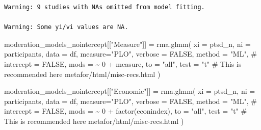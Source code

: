 \documentclass[
  letterpaper,
  DIV=11,
  numbers=noendperiod]{scrartcl}
\newenvironment{Shaded}{\begin{snugshade}}{\end{snugshade}}
\newcommand{\AttributeTok}[1]{\textcolor[rgb]{0.40,0.45,0.13}{#1}}
\newcommand{\CommentTok}[1]{\textcolor[rgb]{0.37,0.37,0.37}{#1}}
\newcommand{\ConstantTok}[1]{\textcolor[rgb]{0.56,0.35,0.01}{#1}}
\newcommand{\DecValTok}[1]{\textcolor[rgb]{0.68,0.00,0.00}{#1}}
\newcommand{\FunctionTok}[1]{\textcolor[rgb]{0.28,0.35,0.67}{#1}}
\newcommand{\NormalTok}[1]{\textcolor[rgb]{0.00,0.23,0.31}{#1}}
\newcommand{\OtherTok}[1]{\textcolor[rgb]{0.00,0.23,0.31}{#1}}
\newcommand{\SpecialCharTok}[1]{\textcolor[rgb]{0.37,0.37,0.37}{#1}}
\newcommand{\StringTok}[1]{\textcolor[rgb]{0.13,0.47,0.30}{#1}}
\begin{document}
\begin{verbatim}
Warning: 9 studies with NAs omitted from model fitting.

Warning: Some yi/vi values are NA.
\end{verbatim}

\begin{Shaded}
\begin{Highlighting}[]
\NormalTok{moderation\_models\_nointercept[[}\StringTok{"Measure"}\NormalTok{]] }\OtherTok{=} \FunctionTok{rma.glmm}\NormalTok{(}
  \AttributeTok{xi =} \StringTok{\textasciigrave{}}\AttributeTok{ptsd\_n}\StringTok{\textasciigrave{}}\NormalTok{, }
  \AttributeTok{ni =} \StringTok{\textasciigrave{}}\AttributeTok{participants}\StringTok{\textasciigrave{}}\NormalTok{, }
  \AttributeTok{data =}\NormalTok{ df, }
  \AttributeTok{measure=}\StringTok{"PLO"}\NormalTok{,}
  \AttributeTok{verbose =} \ConstantTok{FALSE}\NormalTok{,}
  \AttributeTok{method =} \StringTok{"ML"}\NormalTok{,}
  \CommentTok{\# intercept = FALSE,}
  \AttributeTok{mods =} \SpecialCharTok{\textasciitilde{}} \DecValTok{0} \SpecialCharTok{+}\NormalTok{ measure,}
  \AttributeTok{to =} \StringTok{"all"}\NormalTok{,}
  \AttributeTok{test =} \StringTok{"t"} \CommentTok{\# This is recommended here metafor/html/misc{-}recs.html}
\NormalTok{)}

\NormalTok{moderation\_models\_nointercept[[}\StringTok{"Economic"}\NormalTok{]] }\OtherTok{=} \FunctionTok{rma.glmm}\NormalTok{(}
  \AttributeTok{xi =} \StringTok{\textasciigrave{}}\AttributeTok{ptsd\_n}\StringTok{\textasciigrave{}}\NormalTok{, }
  \AttributeTok{ni =} \StringTok{\textasciigrave{}}\AttributeTok{participants}\StringTok{\textasciigrave{}}\NormalTok{, }
  \AttributeTok{data =}\NormalTok{ df, }
  \AttributeTok{measure=}\StringTok{"PLO"}\NormalTok{,}
  \AttributeTok{verbose =} \ConstantTok{FALSE}\NormalTok{,}
  \AttributeTok{method =} \StringTok{"ML"}\NormalTok{,}
  \CommentTok{\# intercept = FALSE,}
  \AttributeTok{mods =} \SpecialCharTok{\textasciitilde{}} \DecValTok{0} \SpecialCharTok{+} \FunctionTok{factor}\NormalTok{(econindex),}
  \AttributeTok{to =} \StringTok{"all"}\NormalTok{,}
  \AttributeTok{test =} \StringTok{"t"} \CommentTok{\# This is recommended here metafor/html/misc{-}recs.html}
\NormalTok{)}


\end{Highlighting}
\end{Shaded}
\end{document}
